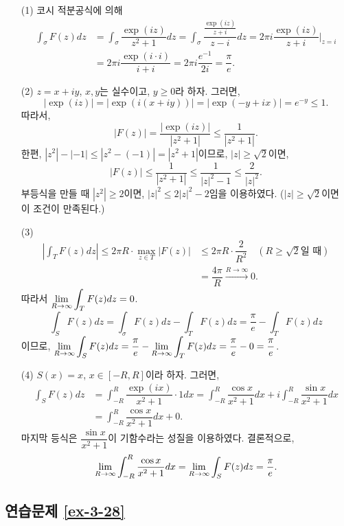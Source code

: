 \begin{itemize}
\item[(1)] 코시 적분공식에 의해
\begin{align*}
\int_\sigma F(z) dz &= \int_\sigma \dfrac{\exp(iz)}{z^2+1}dz
= \int_\sigma \dfrac{\frac{\exp(iz)}{z+i}}{z-i}dz
= 2\pi i \dfrac{\exp(iz)}{z+i}\Big|_{z=i} \\
&= 2\pi i \dfrac{\exp(i\cdot i)}{i+i} = 2\pi i \dfrac{e^{-1}}{2i} = \dfrac\pi e.
\end{align*}

\item[(2)] $z=x+iy$, $x,y$는 실수이고, $y\ge0$라 하자. 그러면,
\[
|\exp(iz)| = |\exp(i(x+iy))| = |\exp(-y+ix)| = e^{-y} \le 1.
\]
따라서,
\[
|F(z)| = \dfrac{|\exp(iz)|}{|z^2+1|} \le \dfrac1{|z^2+1|}.
\]
한편, $|z^2| - |-1| \le |z^2-(-1)| = |z^2+1|$이므로,
$|z|\ge\sqrt{2}$이면,
\[
|F(z)| \le \dfrac1{|z^2+1|} \le \dfrac1{|z|^2-1} \le \dfrac2{|z|^2}.
\]
부등식을 만들 때 $|z^2|\ge 2$이면, $|z|^2\le 2|z|^2 -2$임을 이용하였다.
($|z|\ge\sqrt{2}$이면 이 조건이 만족된다.)
\item[(3)] 
\begin{align*}
\left| \int_T F(z)dz \right| 
\le 2\pi R\cdot \max_{z\in T} |F(z)| &\le 2\pi R\cdot \dfrac 2{R^2} 
\quad (R\ge\sqrt{2}\text{일 때})\\
&= \dfrac{4\pi}R \xrightarrow{R\to\infty} 0.
\end{align*}
따라서 $\lim\limits_{R\to\infty} \displaystyle\int_T F(z) dz = 0$.
\[
\int_S F(z)dz = \int_\sigma F(z) dz - \int_T F(z)dz = \dfrac \pi e -  \int_T F(z)dz
\]
이므로,  $\lim\limits_{R\to\infty} \displaystyle\int_S F(z)dz = \displaystyle\frac\pi e -\lim\limits_{R\to\infty} \int_T F(z)dz
= \displaystyle\frac \pi e - 0 = \displaystyle\frac \pi e$.
\item[(4)] $S(x)=x$, $x\in[-R,R]$이라 하자. 그러면,
\begin{align*}
\int_S F(z)dz &= \int_{-R}^R \dfrac{\exp(ix)}{x^2+1}\cdot 1 dx
=\int_{-R}^R \dfrac{\cos x}{x^2+1} dx 
+ i\int_{-R}^R \dfrac{\sin x}{x^2+1} dx \\
&= \int_{-R}^R \dfrac{\cos x}{x^2+1}dx  + 0.
\end{align*}
마지막 등식은 $\dfrac{\sin x}{x^2+1}$이 기함수라는 성질을 이용하였다.
결론적으로,
\[
\lim\limits_{R\to\infty} \int_{-R}^R \displaystyle\frac{\cos x}{x^2+1}dx
= \lim\limits_{R\to\infty}\int_S F(z)dz = \displaystyle\frac \pi e.
\]
\end{itemize}

\subsection*{연습문제 \ref{ex-3-28}}

